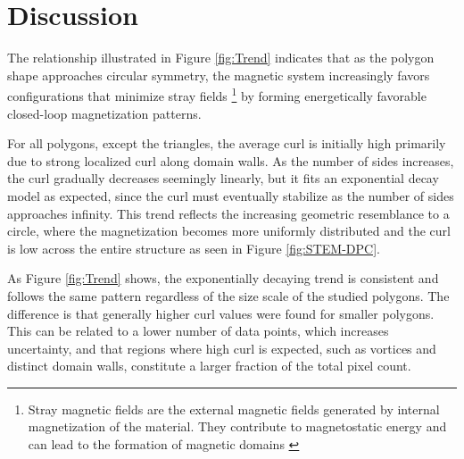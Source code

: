 \section{Discussion}





The relationship illustrated in Figure \ref{fig:Trend} indicates that as the polygon shape approaches circular symmetry, the magnetic system increasingly favors configurations that minimize stray fields \footnote{Stray magnetic fields are the external magnetic fields generated by internal magnetization of the material. They contribute to magnetostatic energy and can lead to the formation of magnetic domains \cite{definitions2025_strayfield}} by forming energetically favorable closed-loop magnetization patterns.

For all polygons, except the triangles, the average curl is initially high primarily due to strong localized curl along domain walls. %
As the number of sides increases, the curl gradually decreases seemingly linearly, but it fits an exponential decay model as expected, since the curl must eventually stabilize as the number of sides approaches infinity. This trend reflects the increasing geometric resemblance to a circle, where the magnetization becomes more uniformly distributed and the curl is low across the entire structure as seen in Figure \ref{fig:STEM-DPC}.%


As Figure \ref{fig:Trend} shows, the exponentially decaying trend is consistent and follows the same pattern regardless of the size scale of the studied polygons. The difference is that generally higher curl values were found for smaller polygons. This can be related to a lower number of data points, which increases uncertainty, and that regions where high curl is expected, such as vortices and distinct domain walls, constitute a larger fraction of the total pixel count.


